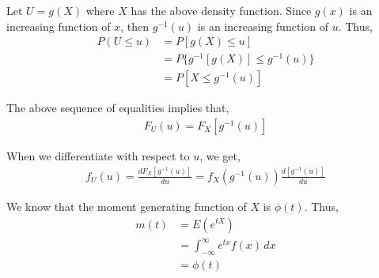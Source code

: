 \documentclass[12pt]{article}
\newenvironment{problem}[2][Problem]{\begin{trivlist}
\item[\hskip \labelsep {\bfseries #1}\hskip \labelsep {\bfseries #2.}]}{\end{trivlist}}
\begin{document}
Let $U = g(X)$ where $X$ has the above density function. Since $g(x)$ is an increasing function of $x$, then $g^{-1}(u)$ is an increasing function of $u$. Thus,
\begin{align*}
P(U \leq u) &= P[g(X) \leq u]\\
&= P\{g^{-1}[g(X)] \leq g^{-1}(u)\}\\
&= P[X \leq g^{-1}(u)]
\end{align*}

The above sequence of equalities implies that,
\begin{align*}
F_U(u) = F_X[g^{-1}(u)]
\end{align*}

When we differentiate with respect to $u$, we get,
\begin{align*}
f_U(u) = \frac{dF_X[g^{-1}(u)]}{du} = f_X(g^{-1}(u))\frac{d[g^{-1}(u)]}{du}
\end{align*}

\begin{problem}{5}
\end{problem}

We know that the moment generating function of $X$ is $\phi(t)$. Thus, 
\begin{align*}
m(t) &= E(e^{tX})\\
&= \int_{-\infty}^{\infty} e^{tx} f(x) \, dx\\
&= \phi(t)
\end{align*}
\end{document}
